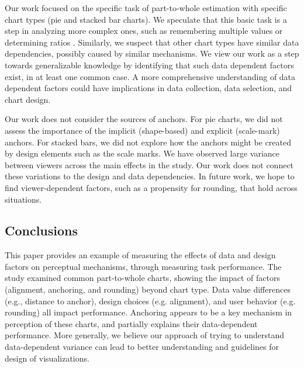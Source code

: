 \documentclass[preprint]{vgtc}               %
\begin{document}
Our work focused on the specific task  of part-to-whole estimation with specific chart types (pie and stacked bar charts). 
We speculate that this basic task is a step in analyzing more complex ones, such as remembering multiple values \cite{mccoleman2021RethinkingRanksVisual} or determining ratios \cite{cleveland1985GraphicalPerceptionGraphical}. 
Similarly, we suspect that other chart types have similar data dependencies, possibly caused by similar mechanisms. 
We view our work as a step towards generalizable knowledge by identifying that such data dependent factors exist, in at least one common case.
A more comprehensive understanding of data dependent factors could have implications in data collection, data selection, and chart design.

Our work does not consider the sources of anchors. 
For pie charts, we did not assess the importance of the implicit (shape-based) and explicit (scale-mark) anchors. 
For stacked bars, we did not explore how the anchors might be created by design elements such as the scale marks.
We have observed large variance between viewers across the main effects in the study.
Our work does not connect these variations to the design and data dependencies.
In future work, we hope to find viewer-dependent factors, such as a propensity for rounding, that hold across situations. 

\subsection{Conclusions}
\label{sec:conclusions}

This paper provides an example of measuring the effects of data and design factors on perceptual mechanisms, through measuring task performance.
The study examined common part-to-whole charts, showing the impact of factors (alignment, anchoring, and rounding) beyond chart type.
Data value differences (e.g., distance to anchor), design choices (e.g. alignment), and user behavior (e.g. rounding) all impact performance. 
Anchoring appears to be a key mechanism in perception of these charts, and partially explains their data-dependent performance.
More generally, we believe our approach of trying to understand data-dependent variance can lead to better understanding and guidelines for design of visualizations.




\end{document}
